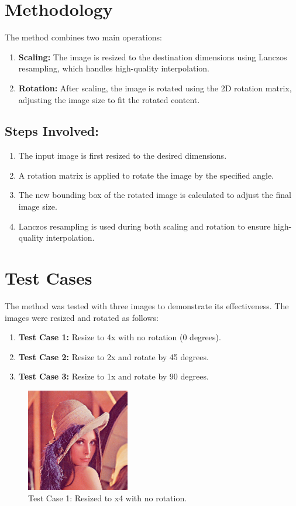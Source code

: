 \documentclass{article}
\begin{document}
\section{Methodology}

The method combines two main operations:
\begin{enumerate}
    \item \textbf{Scaling:} The image is resized to the destination dimensions using Lanczos resampling, which handles high-quality interpolation.
    \item \textbf{Rotation:} After scaling, the image is rotated using the 2D rotation matrix, adjusting the image size to fit the rotated content.
\end{enumerate}

\subsection{Steps Involved:}
\begin{enumerate}
    \item The input image is first resized to the desired dimensions.
    \item A rotation matrix is applied to rotate the image by the specified angle.
    \item The new bounding box of the rotated image is calculated to adjust the final image size.
    \item Lanczos resampling is used during both scaling and rotation to ensure high-quality interpolation.
\end{enumerate}

\section{Test Cases}

The method was tested with three images to demonstrate its effectiveness. The images were resized and rotated as follows:

\begin{enumerate}
    \item \textbf{Test Case 1:} Resize to 4x with no rotation (0 degrees).
    \item \textbf{Test Case 2:} Resize to 2x and rotate by 45 degrees.
    \item \textbf{Test Case 3:} Resize to 1x and rotate by 90 degrees.
\end{enumerate}

\begin{figure}[h!]
    \centering
    \includegraphics[width=0.4\textwidth]{lena_4.00@0.00.png}
    \caption{Test Case 1: Resized to x4 with no rotation.}
\end{figure}
\end{document}
